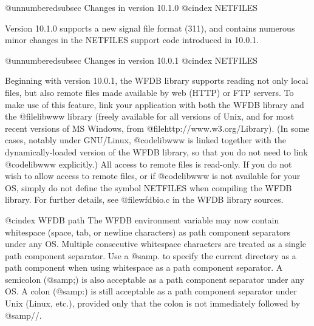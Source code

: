 @unnumberedsubsec Changes in version 10.1.0
@cindex NETFILES

Version 10.1.0 supports a new signal file format (311), and contains
numerous minor changes in the NETFILES support code introduced in 10.0.1.

@unnumberedsubsec Changes in version 10.0.1
@cindex NETFILES

Beginning with version 10.0.1, the WFDB library supports reading not
only local files, but also remote files made available by web (HTTP) or
FTP servers.  To make use of this feature, link your application with
both the WFDB library and the @file{libwww} library (freely available
for all versions of Unix, and for most recent versions of MS Windows,
from @file{http://www.w3.org/Library}).  (In some cases, notably under
GNU/Linux, @code{libwww} is linked together with the dynamically-loaded
version of the WFDB library, so that you do not need to link
@code{libwww} explicitly.)  All access to remote files is read-only.  If
you do not wish to allow access to remote files, or if @code{libwww} is
not available for your OS, simply do not define the symbol NETFILES when
compiling the WFDB library.  For further details, see @file{wfdbio.c} in
the WFDB library sources.

@cindex WFDB path
The WFDB environment variable may now contain whitespace (space, tab, or
newline characters) as path component separators under any OS.  Multiple
consecutive whitespace characters are treated as a single path component
separator.  Use a @samp{.} to specify the current directory as a path component
when using whitespace as a path component separator.  A semicolon (@samp{;}) is
also acceptable as a path component separator under any OS.  A colon (@samp{:})
is still acceptable as a path component separator under Unix (Linux, etc.),
provided only that the colon is not immediately followed by @samp{//}.

